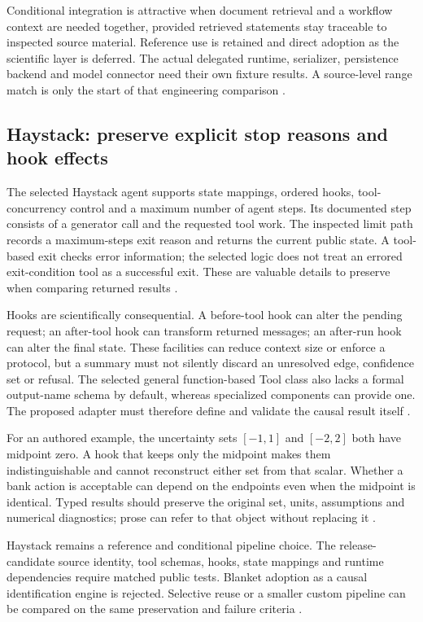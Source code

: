Conditional integration is attractive when document retrieval and a
workflow context are needed together, provided retrieved statements stay
traceable to inspected source material. Reference use is retained and
direct adoption as the scientific layer is deferred. The actual delegated
runtime, serializer, persistence backend and model connector need their
own fixture results. A source-level range match is only the start of
that engineering comparison \citep{exec24_framework_contracts}.

\subsection{Haystack: preserve explicit stop reasons and hook effects}
The selected Haystack agent supports state mappings, ordered hooks,
tool-concurrency control and a maximum number of agent steps. Its
documented step consists of a generator call and the requested tool work.
The inspected limit path records a maximum-steps exit reason and returns
the current public state. A tool-based exit checks error information;
the selected logic does not treat an errored exit-condition tool as a
successful exit. These are valuable details to preserve when comparing
returned results
\citep{exec24_framework_haystack}.

Hooks are scientifically consequential. A before-tool hook can alter
the pending request; an after-tool hook can transform returned messages;
an after-run hook can alter the final state. These facilities can reduce
context size or enforce a protocol, but a summary must not silently
discard an unresolved edge, confidence set or refusal. The selected
general function-based Tool class also lacks a formal output-name schema
by default, whereas specialized components can provide one. The proposed
adapter must therefore define and validate the causal result itself
\citep{exec24_framework_haystack,exec24_framework_contracts}.

For an authored example, the uncertainty sets $[-1,1]$ and $[-2,2]$
both have midpoint zero. A hook that keeps only the midpoint makes them
indistinguishable and cannot reconstruct either set from that scalar.
Whether a bank action is acceptable can depend on the endpoints even
when the midpoint is identical. Typed results should preserve the
original set, units, assumptions and numerical diagnostics; prose can
refer to that object without replacing it
\citep{exec24_framework_contracts}.

Haystack remains a reference and conditional pipeline choice. The
release-candidate source identity, tool schemas, hooks, state mappings
and runtime dependencies require matched public tests. Blanket adoption
as a causal identification engine is rejected. Selective reuse or a
smaller custom pipeline can be compared on the same preservation and
failure criteria \citep{exec24_framework_contracts}.

